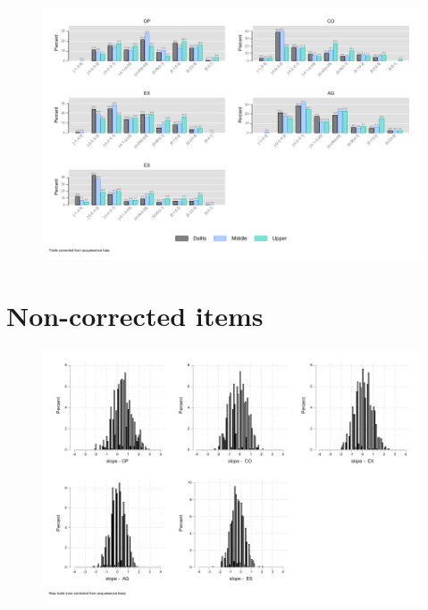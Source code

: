 \documentclass[a4paper, 12pt, onecolumn]{article}
\begin{document}
\begin{figure}[!h]
\raggedright
\includegraphics[scale=0.8]{INPUT/diff_caste_cor}
\caption{}
\label{fig:diffcastecor}
\end{figure}



\clearpage
\newpage
\section{Non-corrected items}

\begin{figure}[!h]
\raggedright
\includegraphics[scale=0.8]{INPUT/diffcont_raw}
\caption{}
\label{fig:diffagecor}
\end{figure}
\end{document}
